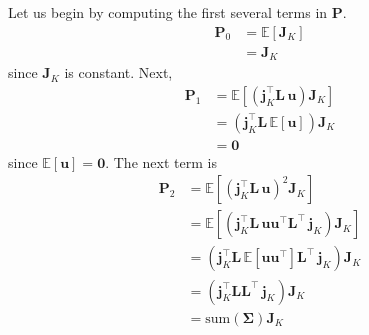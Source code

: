 \documentclass[modern]{aastex62}
\begin{document}
Let us begin by computing the first several terms in $\mathbf{P}$.
%
\begin{align}
    \mathbf{P}_0 & = \mathbb{E}\left[ \mathbf{J}_K \right]
    \nonumber                                              \\
                 & = \mathbf{J}_K
\end{align}
%
since $\mathbf{J}_K$ is constant. Next,
%
\begin{align}
    \mathbf{P}_1 & = \mathbb{E}\left[ \left(\mathbf{j}_K^\top \mathbf{L} \, \mathbf{u}\right) \mathbf{J}_K \right]
    \nonumber                                                                                                      \\
                 & = \left(\mathbf{j}_K^\top \mathbf{L} \, \mathbb{E}\left[ \mathbf{u} \right]\right) \mathbf{J}_K
    \nonumber                                                                                                      \\
                 & = \mathbf{0}
\end{align}
%
since $\mathbb{E}\left[ \mathbf{u} \right] = \mathbf{0}$. The next term is
%
\begin{align}
    \mathbf{P}_2 & = \mathbb{E}\left[ \left(\mathbf{j}_K^\top \mathbf{L} \, \mathbf{u}\right)^2 \mathbf{J}_K \right]
    \nonumber                                                                                                                                                         \\
                 & = \mathbb{E}\left[\left(\mathbf{j}_K^\top \mathbf{L} \,  \mathbf{u} \mathbf{u}^\top  \mathbf{L}^\top \, \mathbf{j}_K \right)  \mathbf{J}_K \right]
    \nonumber                                                                                                                                                         \\
                 & = \left(\mathbf{j}_K^\top \mathbf{L} \, \mathbb{E}\left[ \mathbf{u} \mathbf{u}^\top \right] \mathbf{L}^\top \, \mathbf{j}_K \right)  \mathbf{J}_K
    \nonumber                                                                                                                                                         \\
                 & = \left(\mathbf{j}_K^\top \mathbf{L} \mathbf{L}^\top \, \mathbf{j}_K \right)  \mathbf{J}_K
    \nonumber                                                                                                                                                         \\
                 & = \mathrm{sum}(\mathbf{\Sigma}) \mathbf{J}_K
\end{align}
\end{document}
